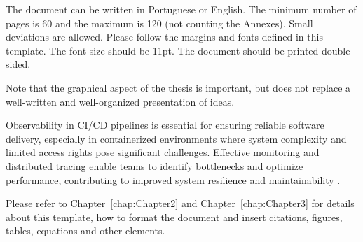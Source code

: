 The document can be written in Portuguese or English. The minimum number of pages is 60 and the maximum is 120 (not counting the Annexes). Small deviations are allowed. Please follow the margins and fonts  defined in this template. The font size should be 11pt. The document should be printed double sided.

Note that the graphical aspect of the thesis is important, but does not replace a well-written and well-organized presentation of ideas.


\par
Observability in CI/CD pipelines is essential for ensuring reliable software delivery, especially in containerized environments where system complexity and limited access rights pose significant challenges. Effective monitoring and distributed tracing enable teams to identify bottlenecks and optimize performance, contributing to improved system resilience and maintainability \parencite{example2020}.

Please refer to Chapter~\ref{chap:Chapter2} and Chapter~\ref{chap:Chapter3} for details about this template, how to format the document and insert citations, figures, tables, equations and other elements.